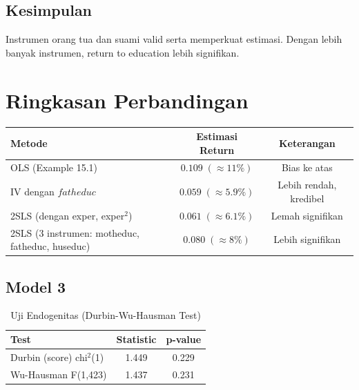 \documentclass[]{article}
\begin{document}
\subsection*{Kesimpulan}
Instrumen orang tua dan suami valid serta memperkuat estimasi. Dengan lebih banyak instrumen, return to education lebih signifikan.
\newpage
\section*{Ringkasan Perbandingan}
\begin{table}[h!]
\centering
\begin{tabular}{@{}lcc@{}}
\toprule
Metode & Estimasi Return & Keterangan \\
\midrule
OLS (Example 15.1) & $0.109 \; (\approx 11\%)$ & Bias ke atas \\
IV dengan $fatheduc$ & $0.059 \; (\approx 5.9\%)$ & Lebih rendah, kredibel \\
2SLS (dengan exper, exper$^2$) & $0.061 \; (\approx 6.1\%)$ & Lemah signifikan \\
2SLS (3 instrumen: motheduc, fatheduc, huseduc) & $0.080 \; (\approx 8\%)$ & Lebih signifikan \\
\bottomrule
\end{tabular}
\end{table}
\subsection*{Model 3}
\begin{table}[htbp]\centering
\caption{Uji Endogenitas (Durbin-Wu-Hausman Test)}
\begin{tabular}{lcc}
\toprule
\textbf{Test} & \textbf{Statistic} & \textbf{p-value} \\
\midrule
Durbin (score) chi$^2$(1) & 1.449 & 0.229 \\
Wu-Hausman F(1,423) & 1.437 & 0.231 \\
\bottomrule
\end{tabular}
\end{table}
\end{document}
